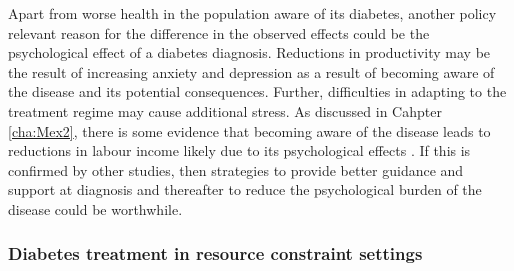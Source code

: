 Apart from worse health in the population aware of its diabetes, another policy relevant reason for the difference in the observed effects could be the psychological effect of a diabetes diagnosis. Reductions in productivity may be the result of increasing anxiety and depression as a result of becoming aware of the disease and its potential consequences. Further, difficulties in adapting to the treatment regime may cause additional stress. As discussed in Cahpter \ref{cha:Mex2}, there is some evidence that becoming aware of the disease leads to reductions in labour income likely due to its psychological effects \parencite{Liu2014}. If this is confirmed by other studies, then strategies to provide better guidance and support at diagnosis and thereafter to reduce the psychological burden of the disease could be worthwhile.



\subsubsection{Diabetes treatment in resource constraint settings}

